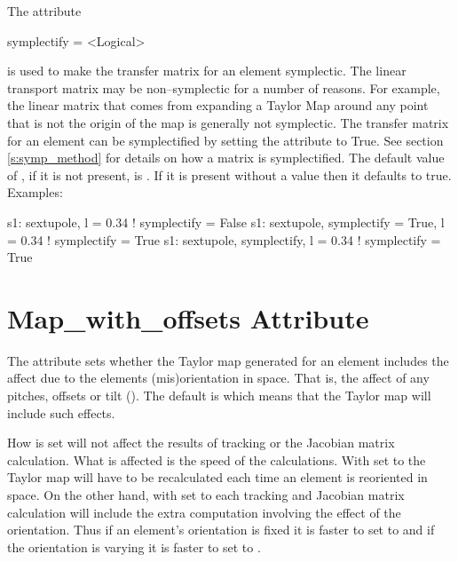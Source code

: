 The  attribute
\begin{example}
  symplectify = <Logical>
\end{example}
is used to make the transfer matrix for an element symplectic. The
linear transport matrix may be non--symplectic for a number of
reasons.  For example, the linear matrix that comes from expanding a
Taylor Map around any point that is not the origin of the map is
generally not symplectic. The transfer matrix for an element can be
symplectified by setting the  attribute to True. See
section \ref{s:symp_method} for details on how a matrix is
symplectified. The default value of , if it is not
present, is . If it is present without a value then it
defaults to true. Examples:
\begin{example}
  s1: sextupole, l = 0.34                       ! symplectify = False
  s1: sextupole, symplectify = True, l = 0.34   ! symplectify = True
  s1: sextupole, symplectify, l = 0.34          ! symplectify = True
\end{example}

\section{Map_with_offsets Attribute}
\label{s:mapoff}

The  attribute sets whether the Taylor map
generated for an element includes the affect due to the elements
(mis)orientation in space. That is, the affect of any pitches, offsets
or tilt (). The default is  which means that
the Taylor map will include such effects. 

How  is set will not affect the results of
tracking or the Jacobian matrix calculation. What is affected is the
speed of the calculations. With  set to 
the Taylor map will have to be recalculated each time an element is
reoriented in space. On the other hand, with  set
to  each tracking and Jacobian matrix calculation will
include the extra computation involving the effect of the
orientation. Thus if an element's orientation is fixed it is faster to
set  to  and if the orientation is
varying it is faster to set  to .
